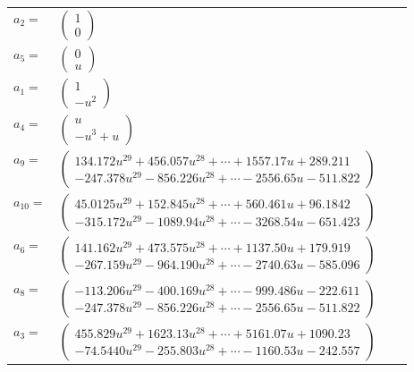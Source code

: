\documentclass[1p]{elsarticle_modified}
\theoremstyle{definition}
\begin{document}
\begin{tabular}{m{7pt} m{180pt} m{7pt} m{180pt} }
\flushright $a_{2}=$&$\begin{pmatrix}1\\0\end{pmatrix}$ \\
\flushright $a_{5}=$&$\begin{pmatrix}0\\u\end{pmatrix}$ \\
\flushright $a_{1}=$&$\begin{pmatrix}1\\- u^2\end{pmatrix}$ \\
\flushright $a_{4}=$&$\begin{pmatrix}u\\- u^3+u\end{pmatrix}$ \\
\flushright $a_{9}=$&$\begin{pmatrix}134.172 u^{29}+456.057 u^{28}+\cdots+1557.17 u+289.211\\-247.378 u^{29}-856.226 u^{28}+\cdots-2556.65 u-511.822\end{pmatrix}$ \\
\flushright $a_{10}=$&$\begin{pmatrix}45.0125 u^{29}+152.845 u^{28}+\cdots+560.461 u+96.1842\\-315.172 u^{29}-1089.94 u^{28}+\cdots-3268.54 u-651.423\end{pmatrix}$ \\
\flushright $a_{6}=$&$\begin{pmatrix}141.162 u^{29}+473.575 u^{28}+\cdots+1137.50 u+179.919\\-267.159 u^{29}-964.190 u^{28}+\cdots-2740.63 u-585.096\end{pmatrix}$ \\
\flushright $a_{8}=$&$\begin{pmatrix}-113.206 u^{29}-400.169 u^{28}+\cdots-999.486 u-222.611\\-247.378 u^{29}-856.226 u^{28}+\cdots-2556.65 u-511.822\end{pmatrix}$ \\
\flushright $a_{3}=$&$\begin{pmatrix}455.829 u^{29}+1623.13 u^{28}+\cdots+5161.07 u+1090.23\\-74.5440 u^{29}-255.803 u^{28}+\cdots-1160.53 u-242.557\end{pmatrix}$ \\

\end{tabular}
\end{document}
